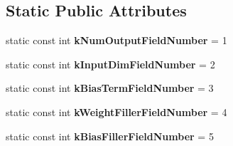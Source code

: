 \subsection*{Static Public Attributes}
\begin{DoxyCompactItemize}
\item 
\mbox{\label{classcaffe_1_1_embed_parameter_a36e28162674de3db3c5b44196f1a98c2}} 
static const int {\bfseries k\+Num\+Output\+Field\+Number} = 1
\item 
\mbox{\label{classcaffe_1_1_embed_parameter_a4a31b679718b873304fd6fd788302bd9}} 
static const int {\bfseries k\+Input\+Dim\+Field\+Number} = 2
\item 
\mbox{\label{classcaffe_1_1_embed_parameter_a1386d6ce679a28be2a8034e8a540ba77}} 
static const int {\bfseries k\+Bias\+Term\+Field\+Number} = 3
\item 
\mbox{\label{classcaffe_1_1_embed_parameter_a29969030d6202ae027dd8249fda47d27}} 
static const int {\bfseries k\+Weight\+Filler\+Field\+Number} = 4
\item 
\mbox{\label{classcaffe_1_1_embed_parameter_aa8b509a86231b6e9a4f6d206e55691b6}} 
static const int {\bfseries k\+Bias\+Filler\+Field\+Number} = 5
\end{DoxyCompactItemize}

